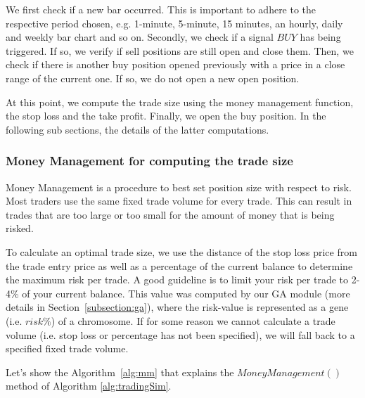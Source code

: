 We first check if a new bar occurred. This is important to adhere to the respective period chosen, e.g. 1-minute,  5-minute, 15 minutes, an hourly, daily and weekly bar chart and so on.
Secondly, we check if a signal $BUY$ has being triggered. If so, we verify if sell positions are still open and close them. Then, we check if there is another buy position opened previously with a price in a close range of the current one. If so, we do not open a new open position.

\noindent At this point, we compute the trade size using the money management function, the stop loss and the take profit. Finally, we open the buy position. In the following sub sections, the details of the latter computations. 

\subsubsection{Money Management for computing the trade size}
Money Management is a procedure to best set position size with respect to risk. Most traders use the same fixed trade volume for every trade. This can result in trades that are too large or too small for the amount of money that is being risked.

To calculate an optimal trade size, we use the distance of the stop loss price from the trade entry price as well as a percentage of the current balance to determine the maximum risk per trade. A good guideline is to limit your risk per trade to 2-4\% of your current balance. This value was computed by our GA module (more details in Section~\ref{subsection:ga}), where the risk-value is represented as a gene (i.e. $risk\%$) of a chromosome. If for some reason we cannot calculate a trade volume (i.e. stop loss or percentage has not been specified), we will fall back to a specified fixed trade volume.

Let's show the Algorithm~\ref{alg:mm} that explains the $MoneyManagement()$ method of Algorithm \ref{alg:tradingSim}. 

